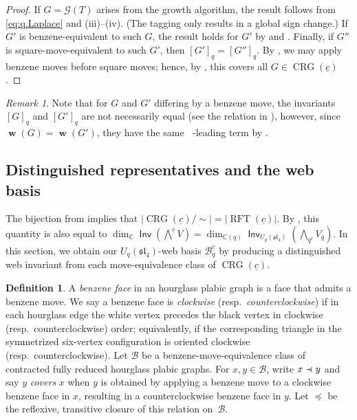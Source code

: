 \documentclass{amsart}
\theoremstyle{definition}
\newtheorem{definition}[theorem]{Definition}
\theoremstyle{remark}
\newtheorem{remark}[theorem]{Remark}
\numberwithin{equation}{section}
\DeclareMathOperator{\bw}{\mathbf{w}}
\DeclareMathOperator{\rft}{RFT}
\newcommand{\fsl}{\mathfrak{sl}}
\DeclareMathOperator{\Inv}{\mathsf{Inv}}
\DeclareMathOperator{\crg}{CRG}
\DeclareMathOperator{\tlex}{l\widetilde{ex}}
\newcommand{\symm}{symmetrized }
\newcommand\precdot{\mathrel{\ooalign{$\prec$\cr
  \hidewidth\raise0.001ex\hbox{$\cdot\mkern0.6mu$}\cr}}}
\begin{document}
\begin{proof}
  If $G = \mathcal{G}(T)$ arises from the growth algorithm, the result follows from \eqref{eq:q.Laplace} and (iii)--(iv). (The tagging only results in a global sign change.) If $G'$ is benzene-equivalent to such $G$, the result holds for $G'$ by  and . Finally, if $G''$ is square-move-equivalent to such $G'$, then $[G']_q = [G'']_q$. By , we may apply benzene moves before square moves; hence, by , this covers all $G \in \crg(\underline{c})$.
\end{proof}

\begin{remark}
Note that for $G$ and $G'$ differing by a benzene move, the invariants $[G]_q$ and $[G']_q$ are not necessarily equal (see the relation in ), however, since $\bw(G)=\bw(G')$, they have the same $\tlex$-leading term by .
\end{remark}

\subsection{Distinguished representatives and the web basis}

The bijection from  implies that $|\crg(\underline{c})/{\sim}| = |\rft(\underline{c})|$. By , this quantity is also equal to $\dim_{\mathbb{C}} \Inv(\bigwedge\nolimits^{\underline{c}} V)=\dim_{\mathbb{C}(q)}\Inv_{U_q(\fsl_4)}(\bigwedge_q\nolimits^{\underline{c}} V_q)$. In this section, we obtain our ${U_q(\fsl_4)}$-web basis $\mathscr{B}_q^{\underline{c}}$ by producing a distinguished web invariant from each move-equivalence class of $\crg(\underline{c})$.

\begin{definition}
A \emph{benzene face} in an hourglass plabic graph is a face that admits a benzene move. We say a benzene face is \emph{clockwise} (resp.\ \emph{counterclockwise}) if in each hourglass edge the white vertex precedes the black vertex in clockwise (resp.\ counterclockwise) order; equivalently, if the corresponding triangle in the \symm six-vertex configuration is oriented clockwise (resp.\ counterclockwise). Let $\mathcal{B}$ be a benzene-move-equivalence class of contracted fully reduced hourglass plabic graphs. For $x, y \in \mathcal{B}$,  write $x \precdot y$ and say $y$ \emph{covers} $x$ when $y$ is obtained by applying a benzene move to a clockwise benzene face in $x$, resulting in a counterclockwise benzene face in $y$. Let $\preceq$ be the reflexive, transitive closure of this relation on~$\mathcal{B}$.
\end{definition}
\end{document}
